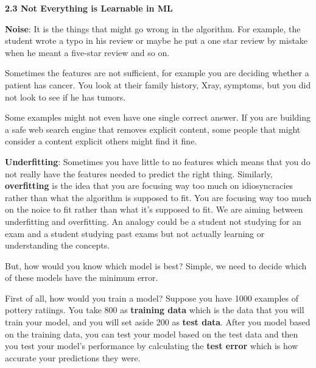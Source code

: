 \documentclass{article}
\begin{document}
\vspace{0.5cm}

\newpage

\LARGE \textbf{2.3 Not Everything is Learnable in ML}

\vspace{0.5cm}

\large \textbf{Noise}: It is the things that might go wrong in the algorithm. For example, the student wrote a typo in his review or maybe he put a one star review by mistake when he meant a five-star review and so on.

\vspace{0.5cm}

Sometimes the features are not sufficient, for example you are deciding whether a patient has cancer. You look at their family history, Xray, symptoms, but you did not look to see if he has tumors. 

\vspace{0.5cm}

Some examples might not even have one single correct answer. If you are building a safe web search engine that removes explicit content, some people that might consider a content explicit others might find it fine.

\vspace{0.5cm}

\textbf{Underfitting}: Sometimes you have little to no features which means that you do not really have the features needed to predict the right thing. Similarly, \textbf{overfitting} is the idea that you are focusing way too much on idiosyncracies rather than what the algorithm is supposed to fit. You are focusing way too much on the noice to fit rather than what it's supposed to fit. We are aiming between underfitting and overfitting. An analogy could be a student not studying for an exam and a student studying past exams but not actually learning or understanding the concepts.

\vspace{0.5cm}

But, how would you know which model is best? Simple, we need to decide which of these models have the minimum error.

\vspace{0.5cm}

First of all, how would you train a model? Suppose you have 1000 examples of pottery ratiings. You take 800 as \textbf{training data} which is the data that you will train your model, and you will set aside 200 as \textbf{test data}. After you model based on the training data, you can test your model based on the test data and then you test your model's performance by calculating the \textbf{test error} which is how accurate your predictions they were.
\end{document}
